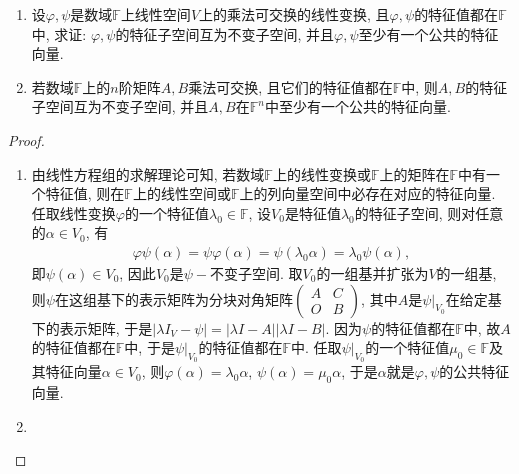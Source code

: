 \documentclass[../../main.tex]{subfiles}
\begin{document}
\begin{proposition}\label{proposition:一般数域上乘法可交换诱导的性质}
\begin{enumerate}
\item 设\(\varphi,\psi\)是数域\(\mathbb{F}\)上线性空间\(V\)上的乘法可交换的线性变换, 且\(\varphi,\psi\)的特征值都在\(\mathbb{F}\)中, 求证: \(\varphi,\psi\)的特征子空间互为不变子空间, 并且\(\varphi,\psi\)至少有一个公共的特征向量.

\item 若数域\(\mathbb{F}\)上的\(n\)阶矩阵\(A,B\)乘法可交换, 且它们的特征值都在\(\mathbb{F}\)中, 则\(A,B\)的特征子空间互为不变子空间, 并且\(A,B\)在\(\mathbb{F}^n\)中至少有一个公共的特征向量.
\end{enumerate}
\end{proposition}
\begin{proof}
\begin{enumerate}
\item 由线性方程组的求解理论可知, 若数域\(\mathbb{F}\)上的线性变换或\(\mathbb{F}\)上的矩阵在\(\mathbb{F}\)中有一个特征值, 则在\(\mathbb{F}\)上的线性空间或\(\mathbb{F}\)上的列向量空间中必存在对应的特征向量. 任取线性变换\(\varphi\)的一个特征值\(\lambda_{0} \in \mathbb{F}\), 设\(V_{0}\)是特征值\(\lambda_{0}\)的特征子空间, 则对任意的\(\alpha \in V_{0}\), 有
\begin{align*}
\varphi\psi(\alpha)=\psi\varphi(\alpha)=\psi(\lambda_{0}\alpha)=\lambda_{0}\psi(\alpha),
\end{align*}
即\(\psi(\alpha) \in V_{0}\), 因此\(V_{0}\)是\(\psi -\)不变子空间. 取\(V_{0}\)的一组基并扩张为\(V\)的一组基, 则\(\psi\)在这组基下的表示矩阵为分块对角矩阵\(\begin{pmatrix}
A&C\\
O&B
\end{pmatrix}\), 其中\(A\)是\(\psi|_{V_{0}}\)在给定基下的表示矩阵, 于是\(|\lambda I_{V}-\psi| = |\lambda I - A||\lambda I - B|\). 因为\(\psi\)的特征值都在\(\mathbb{F}\)中, 故\(A\)的特征值都在\(\mathbb{F}\)中, 于是\(\psi|_{V_{0}}\)的特征值都在\(\mathbb{F}\)中. 任取\(\psi|_{V_{0}}\)的一个特征值\(\mu_{0} \in \mathbb{F}\)及其特征向量\(\alpha \in V_{0}\), 则\(\varphi(\alpha)=\lambda_{0}\alpha\), \(\psi(\alpha)=\mu_{0}\alpha\), 于是\(\alpha\)就是\(\varphi,\psi\)的公共特征向量. 

\item 
\end{enumerate}

\end{proof}
\end{document}
